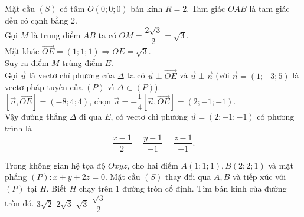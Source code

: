 \begin{ex}
{\begin{center}
\begin{tikzpicture}[scale=0.8,>=stealth, font=\footnotesize, line join=round, line cap=round]
		\end{tikzpicture}
	\end{center}
	Mặt cầu $(S)$ có tâm $O(0; 0; 0)$ bán kính $R=2$. Tam giác $O A B$ là tam giác đều có cạnh bằng 2. \\
	Gọi $M$ là trung điểm $A B$ ta có $O M=\dfrac{2 \sqrt{3}}{2}=\sqrt{3}$.\\
	Mặt khác $\overrightarrow{O E}=(1; 1; 1) \Rightarrow O E=\sqrt{3}$.\\
	Suy ra điểm $M$ trùng điểm $E$. \\
	Gọi $\overrightarrow{u}$ là vectơ chỉ phương của $\Delta$ ta có $\overrightarrow{u} \perp \overrightarrow{O E}$ và $\overrightarrow{u} \perp \overrightarrow{n}$ (với $\overrightarrow{n}=(1;-3; 5)$ là vectơ pháp tuyến của $(P)$ vì $\Delta \subset(P)$).\\
	$[\overrightarrow{n}, \overrightarrow{O E}]=(-8; 4; 4)$, chọn $\overrightarrow{u}=-\dfrac{1}{4}[\overrightarrow{n}, \overrightarrow{O E}]=(2;-1;-1)$.\\
	Vậy đường thẳng $\Delta$ đi qua $E$, có vectơ chì phương $\overrightarrow{u}=(2;-1;-1)$ có phương trình là $$\dfrac{x-1}{2}=\dfrac{y-1}{-1}=\dfrac{z-1}{-1}.$$	
	}
\end{ex}
\begin{ex}%
	Trong không gian hệ tọa độ $O x y z$, cho hai điểm $A(1; 1; 1), B(2; 2; 1)$ và mặt phẳng $(P)\colon x+y+2 z=0$. Mặt cầu $(S)$ thay đổi qua $A, B$ và tiếp xúc với $(P)$ tại $H$. Biết $H$ chạy trên 1 đường tròn cố định. Tìm bán kính của đường tròn đó.
	\choice
	{$3 \sqrt{2}$}
	{\True $2 \sqrt{3}$}
	{$\sqrt{3}$}
	{$\dfrac{\sqrt{3}}{2}$}
\end{ex}
